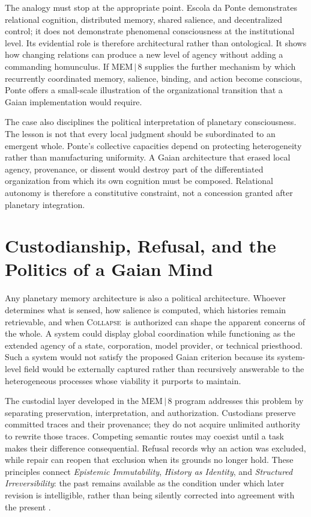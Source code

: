 \documentclass[11pt]{article}
\newcommand{\Collapse}{\textsc{Collapse}}
\begin{document}
The analogy must stop at the appropriate point. Escola da Ponte demonstrates relational cognition, distributed memory, shared salience, and decentralized control; it does not demonstrate phenomenal consciousness at the institutional level. Its evidential role is therefore architectural rather than ontological. It shows how changing relations can produce a new level of agency without adding a commanding homunculus. If MEM\,$|$\,8 supplies the further mechanism by which recurrently coordinated memory, salience, binding, and action become conscious, Ponte offers a small-scale illustration of the organizational transition that a Gaian implementation would require.

The case also disciplines the political interpretation of planetary consciousness. The lesson is not that every local judgment should be subordinated to an emergent whole. Ponte's collective capacities depend on protecting heterogeneity rather than manufacturing uniformity. A Gaian architecture that erased local agency, provenance, or dissent would destroy part of the differentiated organization from which its own cognition must be composed. Relational autonomy is therefore a constitutive constraint, not a concession granted after planetary integration.

\section{Custodianship, Refusal, and the Politics of a Gaian Mind}
\label{sec:custodianship}

Any planetary memory architecture is also a political architecture. Whoever determines what is sensed, how salience is computed, which histories remain retrievable, and when \Collapse\ is authorized can shape the apparent concerns of the whole. A system could display global coordination while functioning as the extended agency of a state, corporation, model provider, or technical priesthood. Such a system would not satisfy the proposed Gaian criterion because its system-level field would be externally captured rather than recursively answerable to the heterogeneous processes whose viability it purports to maintain.

The custodial layer developed in the MEM\,$|$\,8 program addresses this problem by separating preservation, interpretation, and authorization. Custodians preserve committed traces and their provenance; they do not acquire unlimited authority to rewrite those traces. Competing semantic routes may coexist until a task makes their difference consequential. Refusal records why an action was excluded, while repair can reopen that exclusion when its grounds no longer hold. These principles connect \emph{Epistemic Immutability}, \emph{History as Identity}, and \emph{Structured Irreversibility}: the past remains available as the condition under which later revision is intelligible, rather than being silently corrected into agreement with the present \cite{flyxionEI,flyxionHistory,flyxionIrreversibility}.
\end{document}

